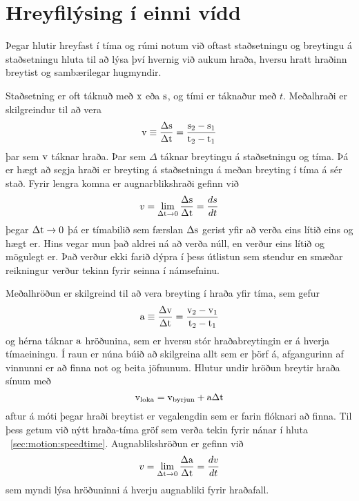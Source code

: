 \section{Hreyfilýsing í einni vídd}
Þegar hlutir hreyfast í tíma og rúmi notum við oftast staðsetningu og breytingu
á staðsetningu hluta til að lýsa því hvernig við aukum hraða, hversu hratt
hraðinn breytist og sambærilegar hugmyndir.

Staðsetning er oft táknuð með $\textrm{x}$ eða $\textrm{s}$, og tími er táknaður 
með $t$. Meðalhraði er skilgreindur til að vera
\begin{equation}
	\textrm{v}
		\equiv \frac{\Delta\textrm{s}}{\Delta\textrm{t}}
		= \frac{\textrm{s}_2 - \textrm{s}_1}{\textrm{t}_2 - \textrm{t}_1}
\end{equation}
þar sem $\textrm{v}$ táknar hraða. Þar sem $\Delta$ táknar breytingu á staðsetningu
og tíma. Þá er hægt að segja hraði er breyting á staðsetningu á meðan breyting í
tíma á sér stað. Fyrir lengra komna er augnarblikshraði gefinn við
\begin{align}
	v = \lim_{\Delta \textrm{t} \to 0} 
		\frac{ \Delta \textrm{s} }{ \Delta \textrm{t}} = \frac{ds}{dt}
\end{align}
%
%
þegar $\Delta \textrm{t} \to 0$ þá er tímabilið sem færslan $\Delta \textrm{s}$ gerist
yfir að verða eins lítið eins og hægt er. Hins vegar mun það aldrei ná að verða núll,
en verður eins lítið og mögulegt er. Það verður ekki farið dýpra í þess útlistun
sem stendur en smæðar reikningur verður tekinn fyrir seinna í námsefninu.


Meðalhröðun er skilgreind til að vera breyting í hraða yfir tíma, sem gefur
\begin{equation}
	\textrm{a} \equiv \frac{\Delta\textrm{v}}{\Delta\textrm{t}}
		= \frac{\textrm{v}_2 - \textrm{v}_1}{\textrm{t}_2 - \textrm{t}_1}
\end{equation}
og hérna táknar $\textrm{a}$ hröðunina, sem er hversu stór hraðabreytingin er
á hverja tímaeiningu. Í raun er núna búið að skilgreina allt sem er þörf á, 
afgangurinn af vinnunni er að finna not og beita jöfnunum. Hlutur undir hröðun
breytir hraða sínum með
\begin{equation}
	\textrm{v}_\text{loka} = \textrm{v}_\text{byrjun} + \textrm{a} \Delta\textrm{t}
\end{equation}
aftur á móti þegar hraði breytist er vegalengdin sem er farin flóknari að finna.
Til þess getum við nýtt hraða-tíma gröf sem verða tekin fyrir nánar í hluta
~\ref{sec:motion:speedtime}.
Augnablikshröðun er gefinn við
\begin{align}
	v = \lim_{\Delta \textrm{t} \to 0} 
		\frac{ \Delta \textrm{a} }{ \Delta \textrm{t}} = \frac{dv}{dt}
\end{align}
sem myndi lýsa hröðuninni á hverju augnabliki fyrir hraðafall.

